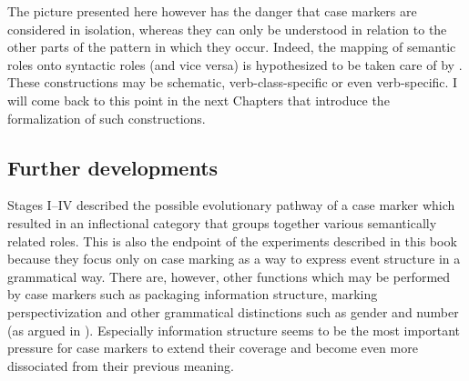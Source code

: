 The picture presented here however has the danger that case markers are considered in isolation, whereas they can only be understood in relation to the other parts of the pattern in which they occur. Indeed, the mapping of semantic roles onto syntactic roles (and vice versa) is hypothesized to be taken care of by  \citep{goldberg95construction}. These constructions may be schematic, verb-class-specific or even verb-specific. I will come back to this point in the next Chapters that introduce the formalization of such constructions.

\subsection{Further developments}
\label{s:case-markers}

Stages I--IV described the possible evolutionary pathway of a case marker which resulted in an inflectional category that groups together various semantically related roles. This is also the endpoint of the experiments described in this book because they focus only on case marking as a way to express event structure in a grammatical way. There are, however, other functions which may be performed by case markers such as packaging information structure, marking perspectivization and other grammatical distinctions such as gender and number (as argued in ). Especially information structure seems to be the most important pressure for case markers to extend their coverage and become even more dissociated from their previous meaning.

